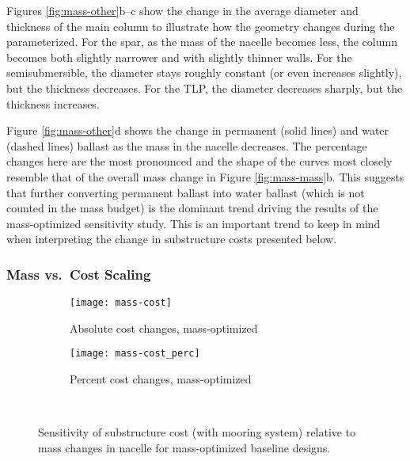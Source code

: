 Figures \ref{fig:mass-other}b--c show the change in the average diameter
and thickness of the main column to illustrate how the geometry changes
during the parameterized.  For the spar, as the mass of the nacelle
becomes less, the column becomes both slightly narrower and with
slightly thinner walls.  For the semisubmersible, the diameter stays
roughly constant (or even increases slightly), but the thickness
decreases.  For the TLP, the diameter decreases sharply, but the
thickness increases.

Figure \ref{fig:mass-other}d shows the change in permanent (solid lines)
and water (dashed lines) ballast as the mass in the nacelle decreases.
The percentage changes here are the most pronounced and the shape of the
curves most closely resemble that of the overall mass change in Figure
\ref{fig:mass-mass}b.  This suggests that further converting permanent
ballast into water ballast (which is not counted in the mass budget) is
the dominant trend driving the results of the mass-optimized sensitivity
study.  This is an important trend to keep in mind when interpreting the
change in substructure costs presented below.


\subsubsection{Mass vs.~Cost Scaling}

\begin{figure}[htbp]
  \begin{subfigure}[b]{0.49\linewidth}
    \centering \texttt{[image: mass-cost]}
    \caption{Absolute cost changes, mass-optimized}
  \end{subfigure}
  \begin{subfigure}[b]{0.49\linewidth}
    \centering \texttt{[image: mass-cost\_perc]}
    \caption{Percent cost changes, mass-optimized}
  \end{subfigure}\\
  \caption{Sensitivity of substructure cost (with mooring system)
    relative to mass changes in nacelle for mass-optimized baseline designs.}
  \label{fig:mass-cost}
\end{figure}

